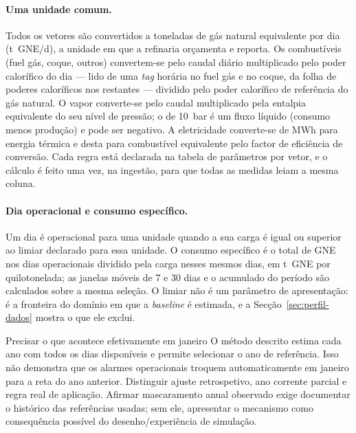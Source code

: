 \paragraph{Uma unidade comum.} Todos os vetores são convertidos a
toneladas de gás natural equivalente por dia (t~GNE/d), a unidade em que
a refinaria orçamenta e reporta. Os combustíveis (fuel gás, coque, outros)
convertem-se pelo caudal diário multiplicado pelo poder calorífico do dia
--- lido de uma \emph{tag} horária no fuel gás e no coque, da folha de
poderes caloríficos nos restantes --- dividido pelo poder calorífico de
referência do gás natural. O vapor converte-se pelo caudal multiplicado
pela entalpia equivalente do seu nível de pressão; o de 10~bar é um fluxo
líquido (consumo menos produção) e pode ser negativo. A eletricidade
converte-se de MWh para energia térmica e desta para combustível
equivalente pelo factor de eficiência de conversão. Cada regra está
declarada na tabela de parâmetros por vetor, e o cálculo é feito uma vez,
na ingestão, para que todas as medidas leiam a mesma coluna.

\paragraph{Dia operacional e consumo específico.} Um dia é operacional
para uma unidade quando a sua carga é igual ou superior ao limiar declarado
para essa unidade. O consumo específico é o total de GNE nos dias
operacionais dividido pela carga nesses mesmos dias, em t~GNE por
quilotonelada; as janelas móveis de 7 e 30 dias e o acumulado do período
são calculados sobre a mesma seleção. O limiar não é um parâmetro de
apresentação: é a fronteira do domínio em que a \emph{baseline} é estimada,
e a Secção~\ref{sec:perfil-dados} mostra o que ele exclui.

{Precisar o que acontece efetivamente em janeiro}
{O método descrito estima cada ano com todos os dias disponíveis e
permite selecionar o ano de referência. Isso não demonstra que os alarmes
operacionais troquem automaticamente em janeiro para a reta do ano
anterior. Distinguir ajuste retrospetivo, ano corrente parcial e regra
real de aplicação. Afirmar mascaramento anual observado exige documentar
o histórico das referências usadas; sem ele, apresentar o mecanismo
como consequência possível do desenho/experiência de simulação.}%
